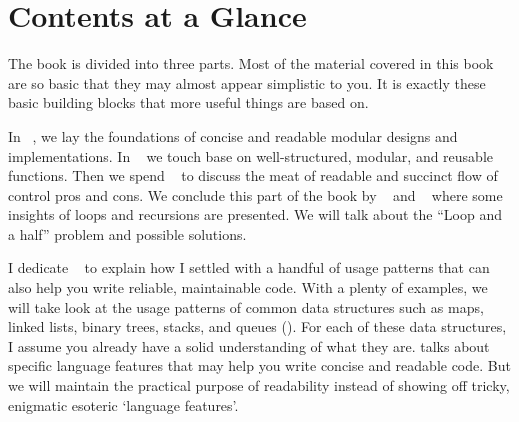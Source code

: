 
\chapter{Contents at a Glance}\label{sec:structureOfTheBook}

The book is divided into three parts.
Most of the material covered in this book are so basic that they may almost appear simplistic to
you.
It is exactly these basic building blocks that more useful things are based on.

In ~, we lay the foundations of concise and readable
modular designs and implementations.
In ~ we touch base on well-structured, modular, and reusable
functions.
Then we spend ~ to discuss the meat of readable and succinct flow of
control pros and cons.
We conclude this part of the book by ~ and ~ where some
insights of loops and recursions are presented. We will talk about the ``Loop and a half''
problem and possible solutions.

I dedicate ~ to explain how I settled
with a handful of usage patterns that can also help you write reliable, maintainable code.
With a plenty of examples, we will take look at the usage
patterns of common data structures such as maps, linked lists, binary trees, stacks, and queues
().
For each of these data structures, I assume you already have a solid understanding of what they
are.
\@{} talks about specific language features that may help
you write concise and readable code.
But we will maintain the practical purpose of readability instead of showing off tricky, enigmatic
esoteric `language features'.


